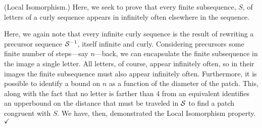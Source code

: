 \documentclass[11pt]{article}
\def\QED{$\checkmark$}
\def\ni{\noindent}
\begin{document}
\medskip
\ni(Local Isomorphism.)  Here, we seek to prove that every finite subsequence, $S$, of letters of a curly sequence appears in infinitely often elsewhere in the sequence.

Here, we again note that every infinite curly sequence is the result of
rewriting a precursor sequence $\mathcal{S}^{-1}$, itself infinite and curly.
Considering precursors some finite number of steps---say $n$---back, we can encapsulate
the finite subsequence in the image a single letter.  All letters, of course,
appear infinitely often, so in their images the finite subsequence must also
appear infinitely often.  Furthermore, it is possible to identify a bound
on $n$ as a function of the diameter of the patch.  This, along with the fact
that no letter is farther than 4 from an equivalent identifies an upperbound
on the distance that must be traveled in $\mathcal{S}$ to find a patch congruent with
$S$.  We have, then, demonstrated the Local Isomorphism property.\QED

\newpage
\pagestyle{empty}
\nocite{Ch09,Ch13,VDB07}


\end{document}
